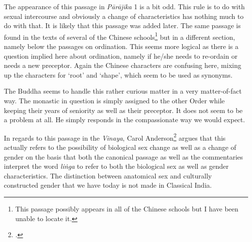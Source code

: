 The appearance of this passage in {\em Pārājika} 1 is a bit odd. This rule is to do with sexual intercourse and obviously a change of characteristics has nothing much to do with that. It is likely that this passage was added later. The same passage is found in the texts of several of the Chinese schools\footnote{This passage possibly appears in all of the Chinese schools but I have been unable to locate it.} but in a different section, namely below the passages on ordination. This seems more logical as there is a question implied here about ordination, namely if he/she needs to re-ordain or needs a new preceptor. Again the Chinese characters are confusing here, mixing up the characters for `root' and `shape', which seem to be used as synonyms.

The Buddha seems to handle this rather curious matter in a very matter-of-fact way. The monastic in question is simply assigned to the other Order while keeping their years of seniority as well as their preceptor. It does not seem to be a problem at all. He simply responds in the compassionate way we would expect.

In regards to this passage in the {\em Vinaya}, Carol Anderson\footnote{\cite{anderson2016a}.} argues that this actually refers to the possibility of biological sex change as well as a change of gender on the basis that both the canonical passage as well as the commentaries interpret the word {\em liṅga} to refer to both the biological sex as well as gender characteristics. The distinction between anatomical sex and culturally constructed gender that we have today is not made in Classical India.

